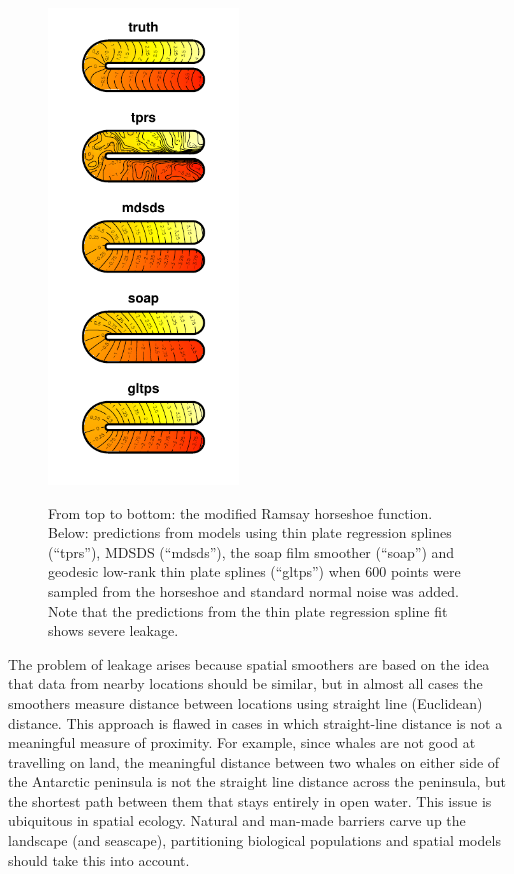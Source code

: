 \documentclass[useAMS, referee]{biom}
\begin{document}
\begin{figure}
\centering
\includegraphics[width=0.45\textwidth]{examples/ramsay/ramsay-real.pdf}\\
\caption{From top to bottom: the modified Ramsay horseshoe function. Below: predictions from models using thin plate regression splines (``tprs''), MDSDS (``mdsds''), the soap film smoother (``soap'') and geodesic low-rank thin plate splines (``gltps'') when 600 points were sampled from the horseshoe and standard normal noise was added. Note that the predictions from the thin plate regression spline fit shows severe leakage.}
\label{leakage}
\end{figure}


The problem of leakage arises because spatial smoothers are based on the idea that data from nearby locations should be similar, but in almost all cases the smoothers measure distance between locations using straight line (Euclidean) distance. This approach is flawed in cases in which straight-line distance is not a meaningful measure of proximity. For example, since whales are not good at travelling on land, the meaningful distance between two whales on either side of the Antarctic peninsula is not the straight line distance across the peninsula, but the shortest path between them that stays entirely in open water. This issue is ubiquitous in spatial ecology. Natural and man-made barriers carve up the landscape (and seascape), partitioning biological populations and spatial models should take this into account. 
\end{document}

